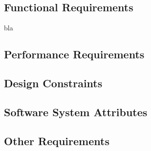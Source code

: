 \documentclass[12pt,a4paper]{report}
\begin{document}
	\subsection*{Functional Requirements}
		bla
		
	\subsection*{Performance Requirements}
	\subsection*{Design Constraints}
	\subsection*{Software System Attributes}
    \subsection*{Other Requirements}
\end{document}
